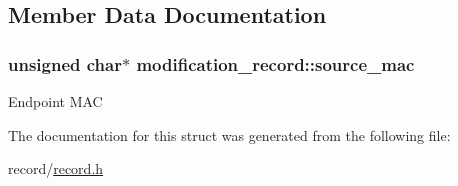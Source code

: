 \subsection{Member Data Documentation}
\hypertarget{structmodification__record_a1a48d3d4e76ae1da78cd61d5738cfed9}{
\subsubsection[{source\-\_\-mac}]{\setlength{\rightskip}{0pt plus 5cm}unsigned char$\ast$ modification\-\_\-record\-::source\-\_\-mac}}\label{structmodification__record_a1a48d3d4e76ae1da78cd61d5738cfed9}
Endpoint M\-A\-C 

The documentation for this struct was generated from the following file\-:\begin{DoxyCompactItemize}
\item 
record/\hyperlink{record_8h}{record.\-h}\end{DoxyCompactItemize}
